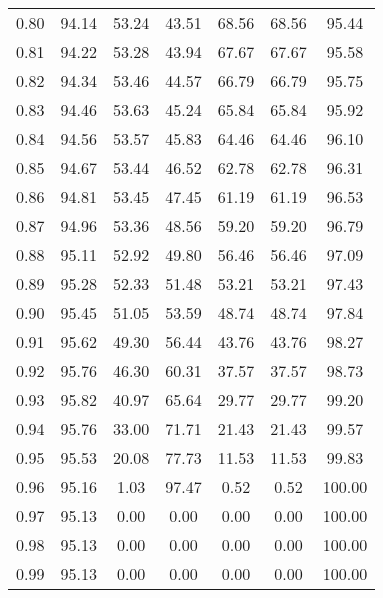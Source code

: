 \begin{tabular}{|c|c|c|c|c|c|c|}
      0.80 &     94.14 &     53.24 &      43.51 &   68.56 &      68.56 &         95.44 \\
      0.81 &     94.22 &     53.28 &      43.94 &   67.67 &      67.67 &         95.58 \\
      0.82 &     94.34 &     53.46 &      44.57 &   66.79 &      66.79 &         95.75 \\
      0.83 &     94.46 &     53.63 &      45.24 &   65.84 &      65.84 &         95.92 \\
      0.84 &     94.56 &     53.57 &      45.83 &   64.46 &      64.46 &         96.10 \\
      0.85 &     94.67 &     53.44 &      46.52 &   62.78 &      62.78 &         96.31 \\
      0.86 &     94.81 &     53.45 &      47.45 &   61.19 &      61.19 &         96.53 \\
      0.87 &     94.96 &     53.36 &      48.56 &   59.20 &      59.20 &         96.79 \\
      0.88 &     95.11 &     52.92 &      49.80 &   56.46 &      56.46 &         97.09 \\
      0.89 &     95.28 &     52.33 &      51.48 &   53.21 &      53.21 &         97.43 \\
      0.90 &     95.45 &     51.05 &      53.59 &   48.74 &      48.74 &         97.84 \\
      0.91 &     95.62 &     49.30 &      56.44 &   43.76 &      43.76 &         98.27 \\
      0.92 &     95.76 &     46.30 &      60.31 &   37.57 &      37.57 &         98.73 \\
      0.93 &     95.82 &     40.97 &      65.64 &   29.77 &      29.77 &         99.20 \\
      0.94 &     95.76 &     33.00 &      71.71 &   21.43 &      21.43 &         99.57 \\
      0.95 &     95.53 &     20.08 &      77.73 &   11.53 &      11.53 &         99.83 \\
      0.96 &     95.16 &      1.03 &      97.47 &    0.52 &       0.52 &        100.00 \\
      0.97 &     95.13 &      0.00 &       0.00 &    0.00 &       0.00 &        100.00 \\
      0.98 &     95.13 &      0.00 &       0.00 &    0.00 &       0.00 &        100.00 \\
      0.99 &     95.13 &      0.00 &       0.00 &    0.00 &       0.00 &        100.00 \\
\bottomrule
\end{tabular}

